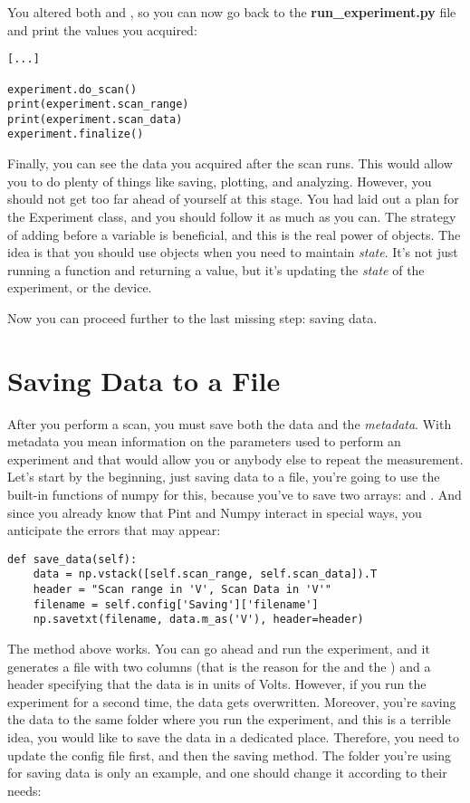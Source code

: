 You altered both  and , so you can now go back to the \textbf{run\_experiment.py} file and print the values you acquired:

\begin{verbatim}
[...]

experiment.do_scan()
print(experiment.scan_range)
print(experiment.scan_data)
experiment.finalize()
\end{verbatim}

Finally, you can see the data you acquired after the scan runs. This would allow you to do plenty of things like saving, plotting, and analyzing. However, you should not get too far ahead of yourself at this stage. You had laid out a plan for the Experiment class, and you should follow it as much as you can. The strategy of adding  before a variable is beneficial, and this is the real power of objects. The idea is that you should use objects when you need to maintain \emph{state}. It's not just running a function and returning a value, but it's updating the \emph{state} of the experiment, or the device.

Now you can proceed further to the last missing step: saving data.

\section{Saving Data to a File}\label{sec:saving-data}
After you perform a scan, you must save both the data and the \emph{metadata}. With metadata you mean information on the parameters used to perform an experiment and that would allow you or anybody else to repeat the measurement. Let's start by the beginning, just saving data to a file, you're going to use the built-in functions of numpy for this, because you've to save two arrays:  and . And since you already know that Pint and Numpy interact in special ways, you anticipate the errors that may appear:

\begin{verbatim}
def save_data(self):
    data = np.vstack([self.scan_range, self.scan_data]).T
    header = "Scan range in 'V', Scan Data in 'V'"
    filename = self.config['Saving']['filename']
    np.savetxt(filename, data.m_as('V'), header=header)
\end{verbatim}

The method above works. You can go ahead and run the experiment, and it generates a file with two columns (that is the reason for the  and the ) and a header specifying that the data is in units of Volts. However, if you run the experiment for a second time, the data gets overwritten. Moreover, you're saving the data to the same folder where you run the experiment, and this is a terrible idea, you would like to save the data in a dedicated place. Therefore, you need to update the config file first, and then the saving method. The folder you're using for saving data is only an example, and one should change it according to their needs:

